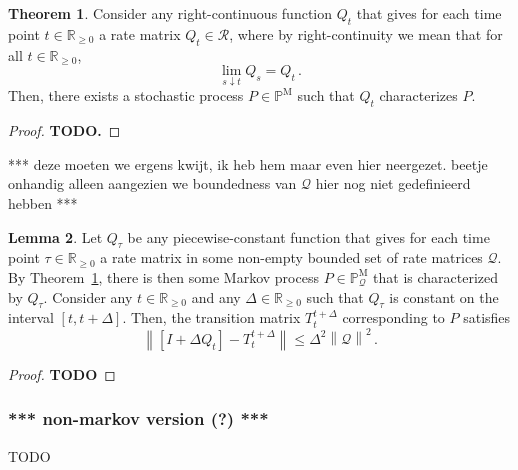 \documentclass[10pt]{paper}
\theoremstyle{definition}
\newtheorem{theorem}{Theorem}
\newtheorem{lemma}[theorem]{Lemma}
\newcommand{\reals}{\mathbb{R}}
\newcommand{\realsnonneg}{\reals_{\geq 0}}
\newcommand{\processes}{\mathbb{P}}
\newcommand{\mprocesses}{\processes^{\mathrm{M}}}
\newcommand{\rateset}{\mathcal{Q}}
\newcommand{\norm}[1]{\left\lVert #1 \right\rVert}
\begin{document}
\begin{theorem}\label{theorem:continuous_rate_matrix_has_process}
Consider any right-continuous function $Q_t$ that gives for each time point $t\in\realsnonneg$ a rate matrix $Q_t\in\mathcal{R}$, where by right-continuity we mean that for all $t\in\realsnonneg$,
\begin{equation*}
\lim_{s\downarrow t} Q_s = Q_t\,.
\end{equation*}
Then, there exists a stochastic process $P\in\mprocesses$ such that $Q_t$ characterizes $P$.
\end{theorem}
\begin{proof}
{\bf TODO.}
\end{proof}

*** deze moeten we ergens kwijt, ik heb hem maar even hier neergezet. beetje onhandig alleen aangezien we boundedness van $\rateset$ hier nog niet gedefinieerd hebben ***

\begin{lemma}\label{lemma:bound_precise_linear_approx}
Let $Q_\tau$ be any piecewise-constant function that gives for each time point $\tau\in\realsnonneg$ a rate matrix in some non-empty bounded set of rate matrices $\rateset$. By Theorem~\ref{theorem:continuous_rate_matrix_has_process}, there is then some Markov process $P\in\mprocesses_\rateset$ that is characterized by $Q_\tau$. Consider any $t\in\realsnonneg$ and any $\Delta\in\realsnonneg$ such that $Q_\tau$ is constant on the interval $[t,t+\Delta]$. Then, the transition matrix $T_t^{t+\Delta}$ corresponding to $P$ satisfies
\begin{equation*}
\norm{\left[I + \Delta Q_t\right] - T_t^{t+\Delta}} \leq \Delta^2\norm{\rateset}^2\,.
\end{equation*}
\end{lemma}
\begin{proof}
{\bf TODO}
\end{proof}

\subsubsection{*** non-markov version (?) ***}
TODO
\end{document}

